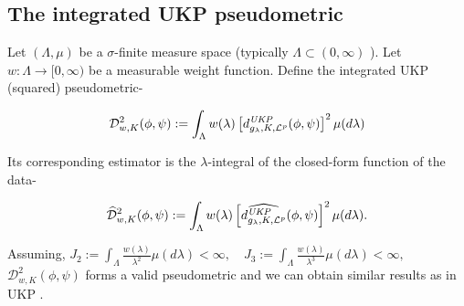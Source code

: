 \documentclass{article} %
\newcommand{\repone}{\phi}
\newcommand{\reptwo}{\psi}
\newcommand{\gl}{g_{\lambda}}
\newcommand{\metricstname}{UKP }
\newcommand{\dLpgl}{d_{\gl,K,\mathcal{L}^{p}}^{\emph{\metricstname}}}
\theoremstyle{plain}
\newcounter{corollarynno}
\newtheorem{corollary}[corollarynno]{Corollary}
\begin{document}

 \subsection{The integrated UKP pseudometric}

Let $(\Lambda, \mu)$ be a $\sigma$-finite measure space (typically $\Lambda \subset(0, \infty)$ ). Let $w: \Lambda \rightarrow[0, \infty)$ be a measurable weight function. Define the integrated UKP (squared) pseudometric-

$$
\mathcal{D}_{w, K}^2(\repone, \reptwo):=\int_{\Lambda} w(\lambda)\left[\dLpgl(\repone, \reptwo)\right]^2 \mu(d \lambda)
$$


Its corresponding estimator is the $\lambda$-integral of the closed-form function of the data-

$$
\widehat{\mathcal{D}}_{w, K}^2(\repone, \reptwo):=\int_{\Lambda} w(\lambda)\left[\widehat{\dLpgl}(\repone, \reptwo)\right]^2 \mu(d \lambda).
$$


Assuming, 
$
J_2:=\int_{\Lambda} \frac{w(\lambda)}{\lambda^2} \mu(d \lambda)<\infty, \quad J_3:=\int_{\Lambda} \frac{w(\lambda)}{\lambda^3} \mu(d \lambda)<\infty,
$
$\mathcal{D}_{w, K}^2(\repone, \reptwo)$ forms a valid pseudometric and we can obtain similar results as in \metricstname.
\end{document}
